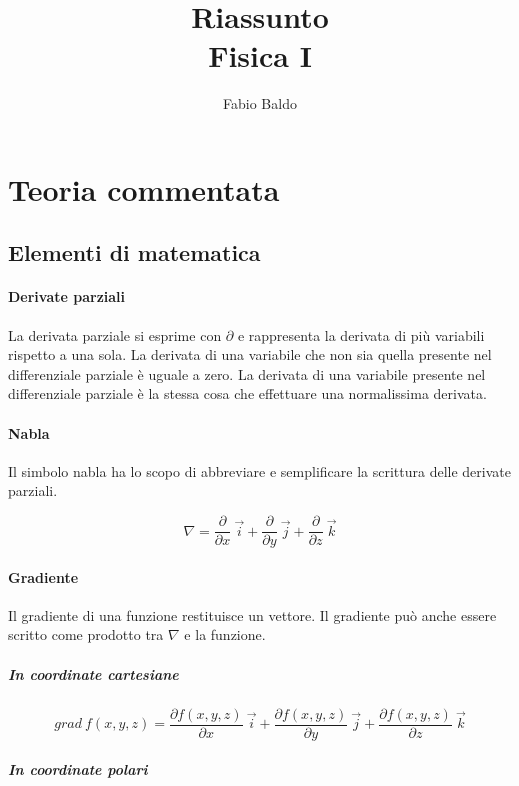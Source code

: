 \documentclass[12pt,a4paper]{report}
\author{Fabio Baldo}
\title{%
Riassunto \\
\large Fisica I}
\begin{document}
\maketitle
\part{Teoria commentata}
\chapter{Elementi di matematica}
	\subsection{Derivate parziali}
	
La derivata parziale si esprime con $\partial$ e rappresenta la derivata di più variabili rispetto a una sola.
La derivata di una variabile che non sia quella presente nel differenziale parziale è uguale a zero.
La derivata di una variabile presente nel differenziale parziale è la stessa cosa che effettuare una normalissima derivata.

	\subsection{Nabla}
Il simbolo nabla ha lo scopo di abbreviare e semplificare la scrittura delle derivate parziali.	
	
	\[ \nabla = \frac{\partial}{\partial x} ~\vec{i} + \frac{\partial}{\partial y} ~\vec{j} + \frac{\partial}{\partial z} ~\vec{k}  \] 

	
	
	\subsection{Gradiente}

Il gradiente di una funzione restituisce un vettore.
Il gradiente può anche essere scritto come prodotto tra $\nabla $ e la funzione.

		\subsubsection{In coordinate cartesiane} 

		\[grad~f(x,y,z) = \frac{\partial f(x,y,z)}{\partial x} ~\vec{i} + \frac{\partial 	f(x,y,z)}{\partial y} ~\vec{j} + \frac{\partial f(x,y,z)}{\partial z} ~\vec{k} \]

		\subsubsection{In coordinate polari}
\end{document}
